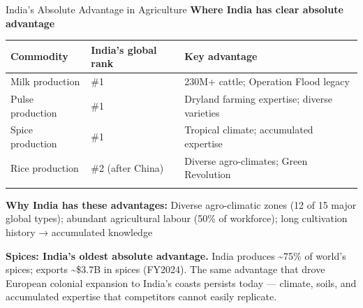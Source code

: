 \documentclass[
  ignorenonframetext,
  aspectratio=169,
]{beamer}
\makeatletter
\let\quarto@originallabel\label
\DeclareRobustCommand*{\label}[1]{\quarto@originallabel{#1}}
\makeatother
\begin{document}
\begin{frame}{India's Absolute Advantage in Agriculture}
\label{indias-absolute-advantage-in-agriculture}
\textbf{Where India has clear absolute advantage}

\begin{longtable}[]{@{}
  >{\raggedright\arraybackslash}p{}
  >{\raggedright\arraybackslash}p{}
  >{\raggedright\arraybackslash}p{}@{}}
\toprule\noalign{}
\begin{minipage}[b]{\linewidth}\raggedright
Commodity
\end{minipage} & \begin{minipage}[b]{\linewidth}\raggedright
India's global rank
\end{minipage} & \begin{minipage}[b]{\linewidth}\raggedright
Key advantage
\end{minipage} \\
\midrule\noalign{}
\endhead
Milk production & \#1 & 230M+ cattle; Operation Flood legacy \\
Pulse production & \#1 & Dryland farming expertise; diverse varieties \\
Spice production & \#1 & Tropical climate; accumulated expertise \\
Rice production & \#2 (after China) & Diverse agro-climates; Green
Revolution \\
\bottomrule\noalign{}
\end{longtable}

\textbf{Why India has these advantages:} Diverse agro-climatic zones (12
of 15 major global types); abundant agricultural labour (50\% of
workforce); long cultivation history → accumulated knowledge

\textbf{Spices: India's oldest absolute advantage.} India produces
\textasciitilde75\% of world's spices; exports \textasciitilde\$3.7B in
spices (FY2024). The same advantage that drove European colonial
expansion to India's coasts persists today --- climate, soils, and
accumulated expertise that competitors cannot easily replicate.
\end{frame}
\end{document}
